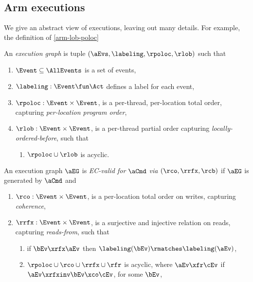 \subsection{Arm executions}
We give an abstract view of \armeight{} executions, leaving out many
details.  For example, the definition of \ref{arm-lob-poloc}
\begin{definition}
  An \emph{\armeight{} execution graph} is tuple
  $(\aEvs, \labeling, {\rpoloc}, {\rlob})$ such that
  \begin{enumerate}[,label=(\textsc{a}\arabic*),ref=\textsc{a}\arabic*]
  \item $\Event\subseteq\AllEvents$ is a set of {events},
  \item $\labeling: \Event \fun \Act$ defines a {label} for each event,
  \item ${\rpoloc} : \Event\times\Event$, is a per-thread, per-location total
    order, capturing \emph{per-location program order},
  \item ${\rlob} : \Event\times\Event$, is a per-thread partial order capturing
    \emph{locally-ordered-before}, such that
    \begin{enumerate}
    \item \label{arm-lob-poloc}
      ${\rpoloc} \cup {\rlob}$ is acyclic.
    \end{enumerate}
  \end{enumerate}
  An \armeight{} execution graph $\aEG$ is \emph{EC-valid for $\aCmd$ via}
  $({\rco}, {\rrfx}, {\rcb})$ if $\aEG$ is generated by $\aCmd$ and 
  \begin{enumerate}[resume,label=(\textsc{a}\arabic*),ref=\textsc{a}\arabic*]
  \item \label{arm-co}
    ${\rco} : \Event\times\Event$, is a per-location total order on
    writes, capturing \emph{coherence}, 
  \item \label{arm-rf}
    ${\rrfx} : \Event\times\Event$, is a surjective and injective
    relation on reads, capturing \emph{reads-from}, such that
    \begin{enumerate}
    \item \label{arm-match}
      if $\bEv\xrfx\aEv$ then $\labeling(\bEv) \rmatches \labeling(\aEv)$,      
    \item \label{arm-local}
      ${\rpoloc} \cup {\rco} \cup {\rrfx} \cup {\rfr}$ is acyclic,
      where $\aEv\xfr\cEv$ if %
      $\aEv\xrfxinv\bEv\xco\cEv$, for some $\bEv$,

\end{enumerate}
\end{enumerate}
\end{definition}
